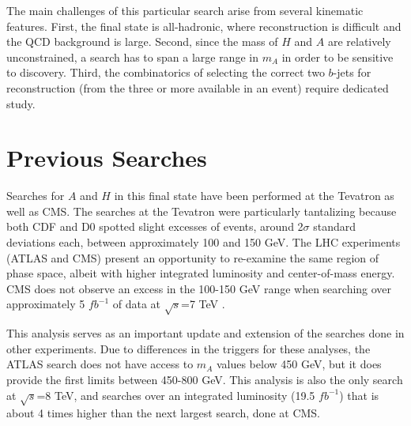 The main challenges of this particular search arise from several kinematic features. 
First, the final state is all-hadronic, where reconstruction is difficult and 
the QCD background is large.  Second, since the mass of $H$ 
and $A$ are relatively unconstrained, a search has to span a large 
range in $m_A$ in order to be sensitive to discovery.  
Third, the combinatorics of selecting the correct two $b$-jets for reconstruction 
(from the three or more available in an event) require dedicated study.  


\section{Previous Searches}
Searches for $A$ and $H$ in this final state have been performed at the Tevatron
as well as CMS.  The searches at the 
Tevatron were particularly tantalizing because both CDF \cite{CDFbH} and D0 \cite{D0bH} spotted 
slight excesses of events, around 2$\sigma$ standard deviations each, between approximately
100 and 150 GeV.  The LHC experiments (ATLAS and CMS) present an opportunity to
re-examine the same region of phase space, albeit with higher integrated luminosity
and center-of-mass energy.  CMS does not observe an excess in the 100-150 GeV range 
when searching over approximately 5 $fb^{-1}$ of data at $\sqrt{s}$=7 TeV \cite{CMSbH}.

This analysis serves as an important update and extension of the searches done
in other experiments.  Due to differences in the triggers for these analyses,
the ATLAS search does not have access to $m_A$ values below 450 GeV, but it does 
provide the first limits between 450-800 GeV.  This analysis is also the only
search at $\sqrt{s}$=8 TeV, and searches over an integrated luminosity (19.5 $fb^{-1}$)
that is about 4 times higher than the next largest search, done at CMS.


 






